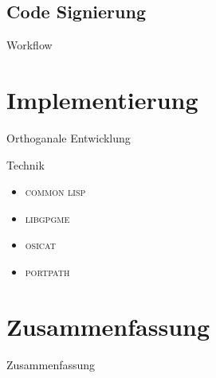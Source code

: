 \documentclass[german]{beamer}
\newcommand{\COMMONLISP}{\textsc{common lisp}}
\newcommand{\LIBGPGME}{\textsc{libgpgme}}
\newcommand{\OSICAT}{\textsc{osicat}}
\newcommand{\PORTPATH}{\textsc{portpath}}
\begin{document}
\subsection{Code Signierung}

\begin{frame}{Workflow}
  
\end{frame}

\section{Implementierung}

\begin{frame}{Orthoganale Entwicklung}
  
\end{frame}

\begin{frame}{Technik}
  \begin{itemize}
  \item \COMMONLISP{}
  \item \LIBGPGME{}
  \item \OSICAT{}
  \item \PORTPATH{}
  \end{itemize}
\end{frame}

\section{Zusammenfassung}

\begin{frame}{Zusammenfassung}
  
\end{frame}
\end{document}
